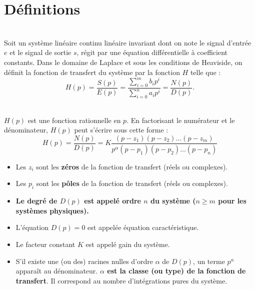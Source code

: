 \documentclass[10pt,fleqn]{article} %
\begin{document}

\vspace{2cm}
\pagestyle{fancy}
\thispagestyle{plain}

\section{Définitions}


\begin{defi} ~\\
Soit un système linéaire continu linéaire invariant dont on note le signal d'entrée $e$ et le signal de sortie $s$, régit par une équation différentielle à coefficient constants. Dans le domaine de Laplace et sous les conditions de Heaviside, on définit la fonction de transfert du système par la fonction $H$ telle que : 
$$
H(p)
=\dfrac{S(p)}{E(p)} 
= \dfrac{\sum\limits_{i=0}^{m} b_i p^i}{\sum\limits_{i=0}^{n} a_i p^i}
=\dfrac{N(p)}{D(p)}.
$$
 

\end{defi}

\begin{defi} ~\\
$H(p)$ est une fonction rationnelle en $p$. En factorisant le numérateur et le
dénominateur, $H(p)$ peut s'écrire sous cette forme :
$$
H(p) = \dfrac{N(p)}{D(p)} =
K \dfrac{\left(p-z_1 \right)\left(p-z_2 \right)...\left(p-z_m \right)}{
p^{\alpha} \left(p-p_1 \right)\left(p-p_2 \right)...\left(p-p_n \right)}
$$


 \begin{itemize}
 \item Les $z_i$ sont les \textbf{zéros} de la fonction de transfert (réels ou
complexes).
\item Les $p_i$ sont les \textbf{pôles} de la fonction de transfert (réels ou
complexes).
\item \textbf{Le degré de $D(p)$ est appelé ordre $n$ du système ($n\geq m$ pour les
systèmes physiques).}
\item L'équation $D(p)=0$ est appelée équation caractéristique.
\item Le facteur constant $K$ est appelé gain du système.
\item S'il existe une (ou des) racines nulles d'ordre $\alpha$ de $D(p)$, un
terme $p^\alpha$ apparaît au dénominateur. \textbf{$\alpha$ est la classe (ou type) de
la fonction de transfert}. Il correspond au nombre d'intégrations pures du
système.
\end{itemize}


\end{defi}
\end{document}
